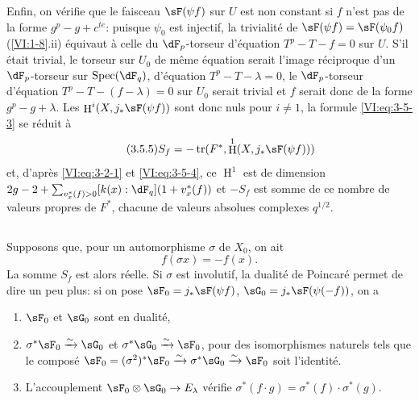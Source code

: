 \documentclass[oneside]{book}
\DeclareMathOperator{\h}{H}
\DeclareMathOperator{\spec}{Spec}
\DeclareMathOperator{\tr}{tr}
\newcommand{\iso}{\xrightarrow\sim}
\theoremstyle{sga-source}
\theoremstyle{sga-source-dash}
\theoremstyle{sga-source-dotdash}
\theoremstyle{sga-source-number-note-dash}
\theoremstyle{sga-source-note-number-dotdash}
\theoremstyle{sga-source-example-dotdash}
\theoremstyle{sga-source-inline-number}
\theoremstyle{sga-source-bare-number}
\theoremstyle{sga-source}
\newcommand{\PrintPage}[1]{}\newcommand{\MathPage}[1]{}\newcommand{\PrintCite}[2]{#1}\newcommand{\var}[3]{#2}
\begin{document}
Enfin, on vérifie que le faisceau $\sF(\psi f)$ sur $U$ est non constant si 
$f$ n'est pas de la forme $g^p-g+c^{t e}$: puisque $\psi_0$ est injectif, la 
trivialité de $\sF(\psi f)=\sF(\psi_0 f)$ (\ref{VI:1-8}.ii) équivaut à 
\var{celle du $\dF_q$-torseur}{celle du $\dF_p$-torseur}{S45-SOL-0771} d'équation $T^p-T-f=0$ sur $U$. S'il était trivial, 
le torseur sur $U_0$ de même équation \PrintPage{192}
serait l'image réciproque d'un 
\var{$\dF_q$-torseur sur $\spec(\dF_q)$}{$\dF_p$-torseur sur $\spec(\dF_q)$}{S45-SOL-0773}, d'équation $T^p-T-\lambda=0$, le 
$\dF_p$-torseur d'équation $T^p-T-(f-\lambda)=0$ sur $U_0$ serait trivial 
et $f$ serait donc de la forme $g^p-g+\lambda$. Les 
$\h^i(X,j_\ast \sF(\psi f))$ sont donc nuls pour $i\ne 1$, la formule 
\eqref{VI:eq:3-5-3} se réduit à 
\begin{equation*}\tag{3.5.5}\label{VI:eq:3-5-5}
  S_f = -\tr(F^\ast,\h^1(X,j_\ast \sF(\psi f))) 
\end{equation*}
et, d'après \eqref{VI:eq:3-2-1} et \eqref{VI:eq:3-5-4}, ce $\h^1$ est de 
dimension $2 g-2+\sum_{v_x^\ast(f)>0} [k(x):\dF_q](1+v_x^\ast(f))$ et $-S_f$ 
est somme de ce nombre de valeurs propres de $F^\ast$, chacune de valeurs 
absolues complexes $q^{1/2}$. 





\subsection{}\label{VI:3-6}

Supposons que, pour un automorphisme $\sigma$ de $X_0$, on ait 
\[
  f(\sigma x) = - f(x) \text{.} 
\]
La somme $S_f$ est alors réelle. Si $\sigma$ est involutif, la dualité de 
Poincaré permet de dire un peu plus: si on pose 
$\sF_0=j_\ast \sF(\psi f)$, $\sG_0 = j_\ast \sF(\psi(-f))$, on a 
\begin{enumerate}[\indent a)]
  \item $\sF_0$ et $\sG_0$ sont en dualité, 
  \item $\sigma^\ast \sF_0 \iso \sG_0$ et $\sigma^\ast \sG_0 \iso \sF_0$, pour 
    des isomorphismes naturels tels que le composé 
    $\sF_0=(\sigma^2)^\ast \sF_0 \iso \sigma^\ast \sG_0 \iso \sF_0$ soit 
    l'identité. 
  \item L'accouplement $\sF_0\otimes \sG_0 \to E_\lambda$ vérifie 
    $\sigma^\ast(f\cdot g) = \sigma^\ast(f) \cdot \sigma^\ast (g)$. 
\end{enumerate} 
\end{document}
